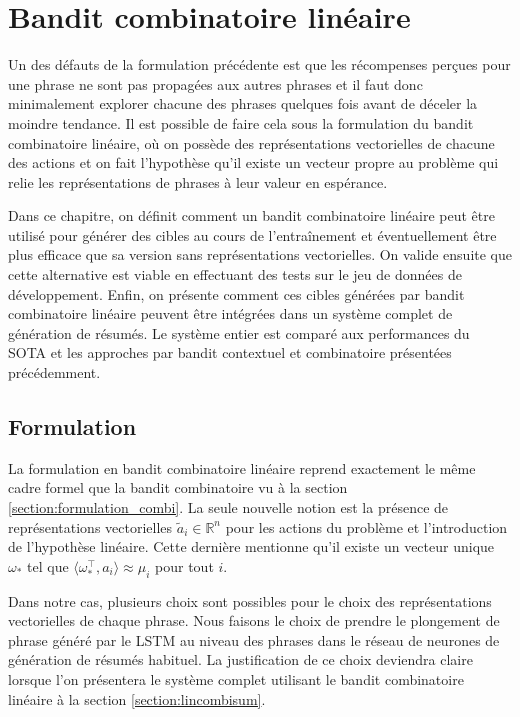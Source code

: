 \chapter{Bandit combinatoire linéaire}
\label{chap:bandit_combi_lin}                   %

Un des défauts de la formulation précédente est que les récompenses
perçues pour une phrase ne sont pas propagées aux autres phrases et il faut
donc minimalement explorer chacune des phrases quelques fois avant de déceler la
moindre tendance.
Il est possible de faire cela sous la formulation du bandit combinatoire linéaire,
où on possède des représentations vectorielles de chacune des actions et on
fait l'hypothèse qu'il existe un vecteur propre au problème qui relie
les représentations de phrases à leur valeur en espérance.

Dans ce chapitre, on définit comment un bandit combinatoire linéaire peut être utilisé
pour générer des cibles au cours de l'entraînement et éventuellement être
plus efficace que sa version sans représentations vectorielles.
On valide ensuite que cette alternative est viable en effectuant des tests sur
le jeu de données de développement.
Enfin, on présente comment ces cibles générées par bandit combinatoire linéaire peuvent
être intégrées dans un système complet de génération de résumés.
Le système entier est comparé aux performances du SOTA et les approches par bandit
contextuel et combinatoire présentées précédemment.

\section{Formulation}

La formulation en bandit combinatoire linéaire reprend exactement le même
cadre formel que la bandit combinatoire vu à la section \ref{section:formulation_combi}.
La seule nouvelle notion est la présence de représentations vectorielles $\tilde{a}_i \in \mathbb{R}^n$
pour les actions du problème et l'introduction de l'hypothèse linéaire.
Cette dernière mentionne qu'il existe un vecteur unique $\omega_*$ tel que
$\langle \omega_*^\intercal, a_i\rangle \approx \mu_i$ pour tout $i$.

Dans notre cas, plusieurs choix sont possibles pour le choix des représentations
vectorielles de chaque phrase.
Nous faisons le choix de prendre le plongement de phrase généré par le
LSTM au niveau des phrases dans le réseau de neurones de génération de résumés
habituel.
La justification de ce choix deviendra claire lorsque l'on présentera
le système complet utilisant le bandit combinatoire linéaire à la section
\ref{section:lincombisum}.


